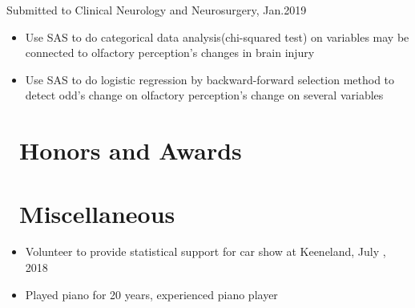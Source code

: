 \documentclass{resume}
\begin{document}
Submitted to Clinical Neurology and Neurosurgery, Jan.2019
\begin{itemize}
  \item Use SAS to do categorical data analysis(chi-squared test) on variables may be connected to olfactory perception's changes in brain injury 
  \item Use SAS to do logistic regression by backward-forward selection method to detect odd's change on olfactory perception's change on several variables 
\end{itemize}


\section{\faHeartO\ Honors and Awards}

\section{\faInfo\ Miscellaneous}
\begin{itemize}[parsep=0.5ex]
  \item Volunteer to provide statistical support for car show at Keeneland, July \textit{}, 2018
  \item Played piano for 20 years, experienced piano player
\end{itemize}

%
%
\end{document}
